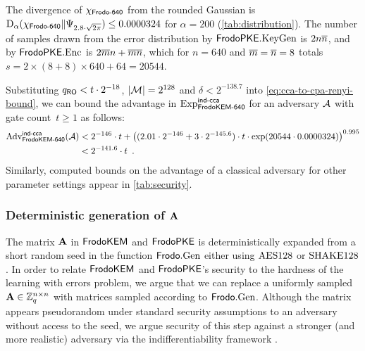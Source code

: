 The \renyi divergence of $\chi_\textsf{\upshape\mdseries Frodo-640}$ from the rounded Gaussian
is $\mathrm{D}_\alpha(\chi_\textsf{\upshape\mdseries Frodo-640}\| \Psi_{2.8\cdot \sqrt{2\pi}}) \leq
0.0000324$ for $\alpha=200$ (\autoref{tab:distribution}). The number of
samples drawn from the error distribution by $\textsf{\upshape\mdseries FrodoPKE}.\textrm{\upshape\mdseries KeyGen}$ is
$2n\overline{n}$, and by $\textsf{\upshape\mdseries FrodoPKE}.\textrm{\upshape\mdseries Enc}$ is $2\overline{m} n+\overline{m} \overline{n}$, which
for $n=640$ and $\overline{m}=\overline{n}=8$ totals
$s=2\times(8 + 8)\times 640+64=20544$.

Substituting $q_{\mathsf{RO}} < t\cdot 2^{-18}$, $|\mathcal{M}|=2^{128}$ and
$\delta<2^{-138.7}$ into \autoref{eq:cca-to-cpa-renyi-bound}, we can
bound the advantage in $\mathrm{Exp}^{\textsf{\upshape\mdseries \textsf{\upshape\mdseries ind-cca}}}_{\textsf{\upshape\mdseries FrodoKEM-640}}$ for an adversary
$\mathcal{A}$ with gate count~$t \geq 1$ as follows:
\begin{align*}
  \mathrm{Adv}^{\textsf{\upshape\mdseries \textsf{\upshape\mdseries ind-cca}}}_{\textsf{\upshape\mdseries FrodoKEM-640}}(\mathcal{A})
  &< 2^{-146} \cdot t + \left((2.01 \cdot 2^{-146} + 3 \cdot
    2^{-145.6}) \cdot t \cdot \exp(20544\cdot 0.0000324)\right)^{0.995} \\
  &< 2^{-141.6} \cdot t \enspace .
\end{align*}
Similarly, computed bounds on the advantage of a classical \INDCCA
adversary for other parameter settings appear
in \autoref{tab:security}.

\subsubsection{Deterministic generation of $\mathbf{A}$}\label{sec:strength:pseudorandom-A}

\newcommand{\idx}{\ensuremath{\mathsf{idx}}}
\newcommand{\Idx}{\ensuremath{\mathrm{Idx}}}
\newcommand{\IC}{\ensuremath{\mathrm{IC}}}

The matrix $\mathbf{A}$ in $\textsf{\upshape\mdseries FrodoKEM}$ and $\textsf{\upshape\mdseries FrodoPKE}$ is  deterministically expanded from a short random seed in the function $\textsf{\upshape\mdseries Frodo}.\textrm{\upshape\mdseries Gen}$ either using $\textrm{\upshape\mdseries AES128}$ or $\textrm{\upshape\mdseries SHAKE}128$. In order to
relate $\textsf{\upshape\mdseries FrodoKEM}$ and $\textsf{\upshape\mdseries FrodoPKE}$'s security to the hardness of the learning with errors
problem, we argue that we can replace a uniformly sampled $\mathbf{A}\in
\mathbb{Z}_q^{n\times n}$ with matrices sampled according to
$\textsf{\upshape\mdseries Frodo}.\textrm{\upshape\mdseries Gen}$. Although the matrix appears pseudorandom under standard security assumptions to an adversary without access to the seed, we argue security of this step against a stronger (and more realistic) adversary via the indifferentiability framework
\cite{TCC:MauRenHol04, C:CDMP05}.

